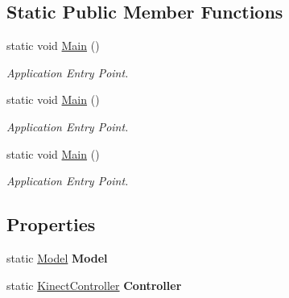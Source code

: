 \subsection*{Static Public Member Functions}
\begin{DoxyCompactItemize}
\item 
static void \hyperlink{class_microsoft_1_1_samples_1_1_kinect_1_1_basic_interactions_1_1_app_ac8c63a882ab489c31c76aa0da9a058ea}{Main} ()
\begin{DoxyCompactList}\small\item\em Application Entry Point. \end{DoxyCompactList}\item 
static void \hyperlink{class_microsoft_1_1_samples_1_1_kinect_1_1_basic_interactions_1_1_app_ac8c63a882ab489c31c76aa0da9a058ea}{Main} ()
\begin{DoxyCompactList}\small\item\em Application Entry Point. \end{DoxyCompactList}\item 
static void \hyperlink{class_microsoft_1_1_samples_1_1_kinect_1_1_basic_interactions_1_1_app_ac8c63a882ab489c31c76aa0da9a058ea}{Main} ()
\begin{DoxyCompactList}\small\item\em Application Entry Point. \end{DoxyCompactList}\end{DoxyCompactItemize}
\subsection*{Properties}
\begin{DoxyCompactItemize}
\item 
\hypertarget{class_microsoft_1_1_samples_1_1_kinect_1_1_basic_interactions_1_1_app_ab5ebd4cacabf7dc1e31f88ae937fa1c6}{static \hyperlink{class_microsoft_1_1_samples_1_1_kinect_1_1_basic_interactions_1_1_model}{Model} {\bfseries Model}}\label{class_microsoft_1_1_samples_1_1_kinect_1_1_basic_interactions_1_1_app_ab5ebd4cacabf7dc1e31f88ae937fa1c6}

\item 
\hypertarget{class_microsoft_1_1_samples_1_1_kinect_1_1_basic_interactions_1_1_app_a4bb6afaa81aac28c822770e071c162b6}{static \hyperlink{class_microsoft_1_1_samples_1_1_kinect_1_1_basic_interactions_1_1_kinect_controller}{Kinect\-Controller} {\bfseries Controller}}\label{class_microsoft_1_1_samples_1_1_kinect_1_1_basic_interactions_1_1_app_a4bb6afaa81aac28c822770e071c162b6}

\end{DoxyCompactItemize}


